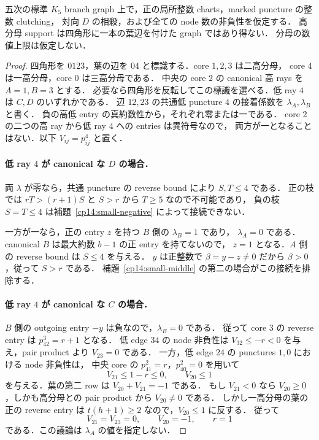\begin{theorem}[四角形と一本の葉辺からなる成分の不存在]
\label{cp14:no-pendant-square}
五次の標準 $K_5$ branch graph 上で，正の局所整数 charts，marked puncture の整数 clutching，
対向 $D$ の相殺，および全ての node 数の非負性を仮定する．
高分母 support は四角形に一本の葉辺を付けた graph ではあり得ない．
分母の数値上限は仮定しない．
\end{theorem}

\begin{proof}
四角形を $0123$，葉の辺を $04$ と標識する．core $1,2,3$ は二高分母，
core $4$ は一高分母，core $0$ は三高分母である．
中央の core $2$ の canonical 高 rays を $A=1,B=3$ とする．
必要なら四角形を反転してこの標識を選べる．低 ray $4$ は $C,D$ のいずれかである．
辺 $12,23$ の共通低 puncture $4$ の接着係数を $\lambda_A,\lambda_B$ と書く．
負の高低 entry の真約数性から，それぞれ零または一である．
core $2$ の二つの高 ray から低 ray $4$ への entries は異符号なので，
両方が一となることはない．以下 $V_{ij}=p^4_{ij}$ と置く．

\paragraph{低 ray $4$ が canonical な $D$ の場合．}
両 $\lambda$ が零なら，共通 puncture の reverse bound により $S,T\leq4$ である．
正の枝では $rT>(r+1)S$ と $S>r$ から $T\geq5$ なので不可能であり，
負の枝 $S=T\leq4$ は補題~\ref{cp14:small-negative} によって接続できない．

一方が一なら，正の entry $z$ を持つ $B$ 側の $\lambda_B=1$ であり，
$\lambda_A=0$ である．canonical $B$ は最大約数 $b-1$ の正 entry を持てないので，
$z=1$ となる．$A$ 側の reverse bound は $S\leq4$ を与える．
$y$ は正整数で $\beta=y-z\ne0$ だから $\beta>0$，従って $S>r$ である．
補題~\ref{cp14:small-middle} の第二の場合がこの接続を排除する．

\paragraph{低 ray $4$ が canonical な $C$ の場合．}
$B$ 側の outgoing entry $-y$ は負なので，$\lambda_B=0$ である．
従って core $3$ の reverse entry は $p^3_{42}=r+1$ となる．
低 edge $34$ の node 非負性は $V_{32}\leq-r<0$ を与え，pair product より $V_{23}=0$ である．
一方，低 edge $24$ の punctures $1,0$ における node 非負性は，
中央 core の $p^2_{41}=r$，$p^2_{40}=0$ を用いて
\[
 V_{21}\leq1-r\leq0,\qquad V_{20}\leq1
\]
を与える．葉の第二 row は $V_{20}+V_{21}=-1$ である．
もし $V_{21}<0$ なら $V_{20}\geq0$，しかも高分母との pair product から $V_{20}\ne0$ である．
しかし一高分母の葉の正の reverse entry は $t(h+1)\geq2$ なので，$V_{20}\leq1$ に反する．
従って
\[
 V_{21}=V_{23}=0,\qquad V_{20}=-1,\qquad r=1
\]
である．この議論は $\lambda_A$ の値を指定しない．


\end{proof}
